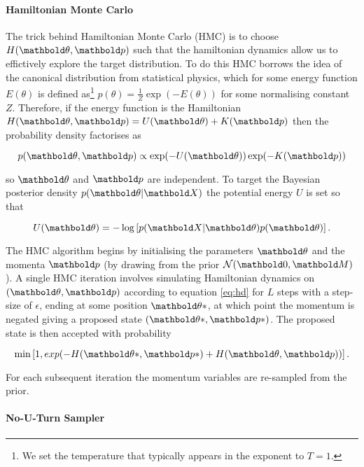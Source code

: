 \paragraph{Hamiltonian Monte Carlo}

The trick behind Hamiltonian Monte Carlo (HMC) is to choose $H(\mbtheta, \mbp)$ such that the hamiltonian dynamics allow us to effictively explore the target distribution. To do this HMC borrows the idea of the canonical distribution from statistical physics, which for some energy function $E(\theta)$ is defined as\footnote{We set the temperature that typically appears in the exponent to $T=1$.} $p(\theta) = \frac{1}{Z}\exp(-E(\theta))$ for some normalising constant $Z$. Therefore, if the energy function is the Hamiltonian $H(\mbtheta, \mbp) = U(\mbtheta) + K(\mbp)$ then the probability density factorises as

\begin{equation}
	p(\mbtheta, \mbp) \propto \exp(-U(\mbtheta)) \exp(-K(\mbp))
\end{equation}

so $\mbtheta$ and $\mbp$ are independent. To target the Bayesian posterior density $p(\mbtheta | \mbX)$ the potential energy $U$ is set so that

\begin{equation}
	U(\mbtheta) = -\log\left[ p(\mbX | \mbtheta) p(\mbtheta )\right].
\end{equation}

The HMC algorithm begins by initialising the parameters $\mbtheta$ and the momenta $\mbp$ (by drawing from the prior $\Norm(\mbzero, \mbM)$). A single HMC iteration involves simulating Hamiltonian dynamics on $(\mbtheta, \mbp)$ according to equation \ref{eq:hd} for $L$ steps with a step-size of $\epsilon$, ending at some position $\mbtheta*$, at which point the momentum is negated giving a proposed state $(\mbtheta*, \mbp*)$. The proposed state is then accepted with probability

\begin{equation}
	\text{min}\left[ 1, exp(-H(\mbtheta*, \mbp*) + H(\mbtheta, \mbp))\right].
\end{equation}

For each subsequent iteration the momentum variables are re-sampled from the prior.

\paragraph{No-U-Turn Sampler}


